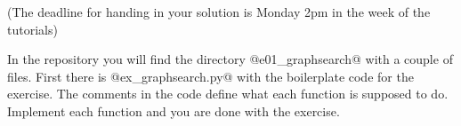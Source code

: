 

\renewcommand{\course}{Artificial Intelligence}
\renewcommand{\coursepicture}{course_ai}
\renewcommand{\coursedate}{Winter 2019}
\renewcommand{\exnum}{1}

\exercises
{}
\exercisestitle










(The deadline for handing in your solution is Monday 2pm in the week of the tutorials)

In the repository you will find the directory @e01_graphsearch@ with a
couple of files. First there is @ex_graphsearch.py@ with the
boilerplate code for the exercise. The comments in the code define
what each function is supposed to do. Implement each function and you
are done with the exercise.

